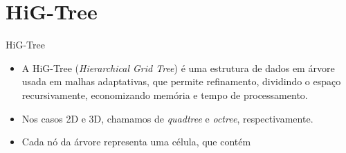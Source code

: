 \documentclass[../main/main.tex]{subfiles}
\begin{document}
\section{HiG-Tree}
\begin{frame}{HiG-Tree}
    \begin{itemize}
        \item A HiG-Tree (\textit{Hierarchical Grid Tree}) é uma estrutura de dados em árvore usada em malhas adaptativas, que permite refinamento, dividindo o espaço recursivamente, economizando memória e tempo de processamento.

        \item Nos casos 2D e 3D, chamamos de \textit{quadtree} e \textit{octree}, respectivamente.

        \item Cada nó da árvore representa uma célula, que contém
    \end{itemize}
\end{frame}
\end{document}
